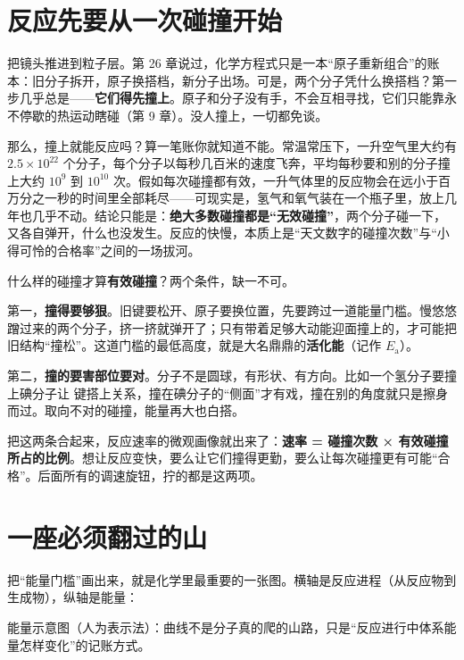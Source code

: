 \section{反应先要从一次碰撞开始}

把镜头推进到粒子层。第 26 章说过，化学方程式只是一本“原子重新组合”的账本：旧分子拆开，原子换搭档，新分子出场。可是，两个分子凭什么换搭档？第一步几乎总是——\textbf{它们得先撞上}。原子和分子没有手，不会互相寻找，它们只能靠永不停歇的热运动瞎碰（第 9 章）。没人撞上，一切都免谈。

那么，撞上就能反应吗？算一笔账你就知道不能。常温常压下，一升空气里大约有 $2.5\times 10^{22}$ 个分子，每个分子以每秒几百米的速度飞奔，平均每秒要和别的分子撞上大约 $10^{9}$ 到 $10^{10}$ 次。假如每次碰撞都有效，一升气体里的反应物会在远小于百万分之一秒的时间里全部耗尽——可现实是，氢气和氧气装在一个瓶子里，放上几年也几乎不动。结论只能是：\textbf{绝大多数碰撞都是“无效碰撞”}，两个分子碰一下，又各自弹开，什么也没发生。反应的快慢，本质上是“天文数字的碰撞次数”与“小得可怜的合格率”之间的一场拔河。

什么样的碰撞才算\textbf{有效碰撞}？两个条件，缺一不可。

第一，\textbf{撞得要够狠}。旧键要松开、原子要换位置，先要跨过一道能量门槛。慢悠悠蹭过来的两个分子，挤一挤就弹开了；只有带着足够大动能迎面撞上的，才可能把旧结构“撞松”。这道门槛的最低高度，就是大名鼎鼎的\textbf{活化能}（记作 $E_{\mathrm{a}}$）。

第二，\textbf{撞的要害部位要对}。分子不是圆球，有形状、有方向。比如一个氢分子要撞上碘分子让  键搭上关系，撞在碘分子的“侧面”才有戏，撞在别的角度就只是擦身而过。取向不对的碰撞，能量再大也白搭。

把这两条合起来，反应速率的微观画像就出来了：\textbf{速率 = 碰撞次数 × 有效碰撞所占的比例}。想让反应变快，要么让它们撞得更勤，要么让每次碰撞更有可能“合格”。后面所有的调速旋钮，拧的都是这两项。

\section{一座必须翻过的山}

把“能量门槛”画出来，就是化学里最重要的一张图。横轴是反应进程（从反应物到生成物），纵轴是能量：

\begin{center}

\footnotesize 能量示意图（人为表示法）：曲线不是分子真的爬的山路，只是“反应进行中体系能量怎样变化”的记账方式。
\end{center}

